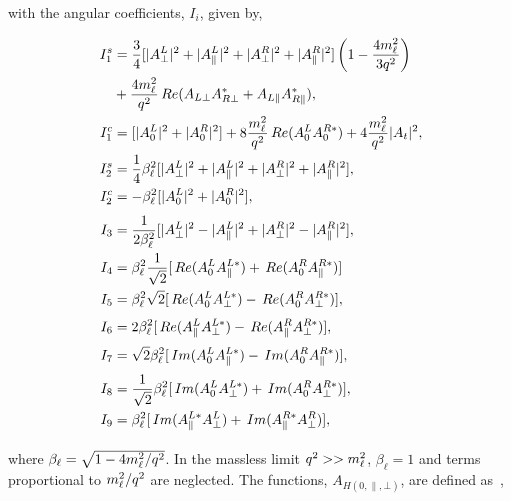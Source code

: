 \noindent with the angular coefficients, $I_{i}$, given by,

\begin{equation}
\begin{aligned}
\frac{}{} I_1^s &= \frac{3}{4}[|A_{\bot}^{L}|^2 + |A_{\parallel}^{L}|^2 + |A_{\bot}^{R}|^2 + |A_{\parallel}^{R}|^2]\left(1-\frac{4m_{\ell}^{2}}{3{q^2}}\right) \\
& +\frac{4m_{\ell}^{2}}{{q^2}}\, Re(A_{L\bot}A_{R\bot}^*+A_{L\parallel}A_{R\parallel}^*), \\
\frac{}{} I_1^c &= [|A_{0}^{L}|^2 + |A_{0}^{R}|^2] + 8\frac{m_{\ell}^{2}}{{q^2}}\, Re(A_{0}^{L}A_{0}^{R*}) + 4\frac{m_{\ell}^{2}}{{q^2}}|A_{t}|^2, \\
\frac{}{} I_2^s &= \frac{1}{4}\beta_{\ell}^{2}[|A_{\bot}^{L}|^2 + |A_{\parallel}^{L}|^2 + |A_{\bot}^{R}|^2 + |A_{\parallel}^{R}|^2], \\
\frac{}{} I_2^c &= -\beta_{\ell}^{2}[|A_{0}^{L}|^2 + |A_{0}^{R}|^2], \\
\frac{}{} I_3   &= \frac{1}{2\beta_{\ell}^{2}}[|A_{\bot}^{L}|^2 - |A_{\parallel}^{L}|^2 + |A_{\bot}^{R}|^2 - |A_{\parallel}^{R}|^2], \\
\frac{}{} I_4 &= \beta_{\ell}^{2}\frac{1}{\sqrt{2}}[\, Re(A_{0}^{L}A_{\parallel}^{L*})+\, Re(A_{0}^{R}A_{\parallel}^{R*})] \\
\frac{}{} I_5 &= \beta_{\ell}^{2}\sqrt{2}[\, Re(A_{0}^{L}A_{\bot}^{L*})-\, Re(A_{0}^{R}A_{\bot}^{R*})], \\
\frac{}{} I_6 &= 2\beta_{\ell}^{2}[\, Re(A_{\parallel}^{L}A_{\bot}^{L*})-\, Re(A_{\parallel}^{R}A_{\bot}^{R*})], \\
\frac{}{} I_7 &= \sqrt{2}\beta_{\ell}^{2}[\, Im(A_{0}^{L}A_{\parallel}^{L*})-\, Im(A_{0}^{R}A_{\parallel}^{R*})], \\
\frac{}{} I_8 &= \frac{1}{\sqrt{2}}\beta_{\ell}^{2}[\, Im(A_{0}^{L}A_{\bot}^{L*})+\, Im(A_{0}^{R}A_{\bot}^{R*})], \\
\frac{}{} I_9 &= \beta_{\ell}^{2}[\, Im(A_{\parallel}^{L*}A_{\bot}^{L})+\, Im(A_{\parallel}^{R*}A_{\bot}^{R})],
\end{aligned}
\end{equation}

\noindent where $\beta_{\ell} = \sqrt{1-4m_{\ell}^{2}/{q^2}}$. In the massless limit ${q^2}>>m_{\ell}^{2}$, $\beta_{\ell}=1$ and terms proportional to $m_{\ell}^{2}/{q^2}$ are neglected. The functions, $A_{H(0,\parallel,\bot)}$, are defined as~\cite{lu-wang},

